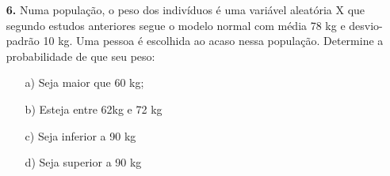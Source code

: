 \begin{itemize}
	\item[\textbf{6.}] Numa população, o peso dos indivíduos é uma variável aleatória X que segundo estudos anteriores segue o modelo normal com média 78 kg e desvio-padrão 10 kg. Uma pessoa é escolhida ao acaso nessa população. Determine a probabilidade de que seu peso:
		\begin{itemize}
		\item[a)] Seja maior que 60 kg;
	        \resposta{}
		\item[b)] Esteja entre 62kg e 72 kg
		    \resposta{}
		\item[c)] Seja inferior a 90 kg
		    \resposta{}
		\item[d)] Seja superior a 90 kg
		    \resposta{}
	\end{itemize}
	
\end{itemize}
